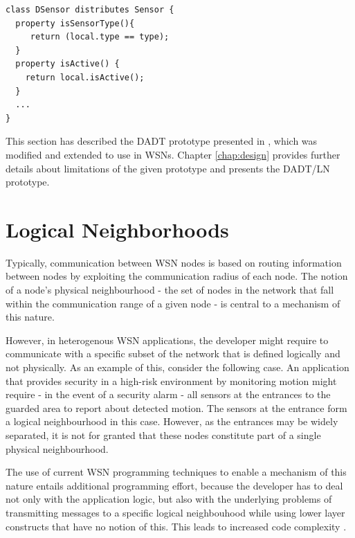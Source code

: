 \begin{lstlisting}[frame=trbl, basewidth={0.55em, 0.6em}, captionpos=b, 
basicstyle=\ttfamily\footnotesize, breaklines, caption = Definition of DADT Properties, label = listing:DADTProperty ]  
class DSensor distributes Sensor {
  property isSensorType(){
	 return (local.type == type);
  }
  property isActive() {
	return local.isActive();
  }
  ...
}

\end{lstlisting}

This section has described the DADT prototype presented in
\cite{migliavacca_DADT:2006}, which was modified and extended to use in WSNs. 
Chapter \ref{chap:design} provides further details about limitations of the
given prototype and presents the DADT/LN prototype. 

\section {Logical Neighborhoods} \label{LNDescription}

Typically, communication between WSN nodes is based on routing 
information between nodes by exploiting the communication radius of each node.
The notion of a node's physical neighbourhood - the set of nodes in the
network that fall within the communication range of a given node - is central to a mechanism of this nature.

However, in heterogenous WSN applications, the developer might require to
communicate with a specific subset of the network that is defined logically and
not physically. As an example of this, consider the following case. An
application that provides security in a high-risk environment by monitoring 
motion might require - in the event of a security alarm - all sensors at the
entrances to the guarded area to report about detected motion.
The sensors at the entrance form a logical neighbourhood in this case. However,
as the entrances may be widely separated, it is not for granted that these nodes
constitute part of a single physical neighbourhood.

The use of current WSN programming techniques to enable a mechanism of this
nature entails additional programming effort, because the developer has to deal
not only with the application logic, but also with the underlying problems of
transmitting messages to a specific logical neighbouhood while using lower layer
constructs that have no notion of this. This leads to increased code complexity
\cite{mottola_LN:2006}.

